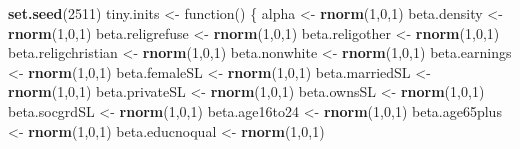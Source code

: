 \documentclass[12pt,twoside]{article}
\newenvironment{Shaded}{}{}
\newcommand{\KeywordTok}[1]{\textcolor[rgb]{0.00,0.44,0.13}{\textbf{{#1}}}}
\newcommand{\DecValTok}[1]{\textcolor[rgb]{0.25,0.63,0.44}{{#1}}}
\newcommand{\StringTok}[1]{\textcolor[rgb]{0.25,0.44,0.63}{{#1}}}
\newcommand{\NormalTok}[1]{{#1}}
\begin{document}
\begin{Shaded}
\begin{Highlighting}[]
\KeywordTok{set.seed}\NormalTok{(}\DecValTok{2511}\NormalTok{)}
\NormalTok{tiny.inits <-}\StringTok{ }\NormalTok{function() \{}
            \NormalTok{alpha <-}\StringTok{ }\KeywordTok{rnorm}\NormalTok{(}\DecValTok{1}\NormalTok{,}\DecValTok{0}\NormalTok{,}\DecValTok{1}\NormalTok{)}
            \NormalTok{beta.density <-}\StringTok{ }\KeywordTok{rnorm}\NormalTok{(}\DecValTok{1}\NormalTok{,}\DecValTok{0}\NormalTok{,}\DecValTok{1}\NormalTok{)}
            \NormalTok{beta.religrefuse <-}\StringTok{ }\KeywordTok{rnorm}\NormalTok{(}\DecValTok{1}\NormalTok{,}\DecValTok{0}\NormalTok{,}\DecValTok{1}\NormalTok{)}
            \NormalTok{beta.religother <-}\StringTok{ }\KeywordTok{rnorm}\NormalTok{(}\DecValTok{1}\NormalTok{,}\DecValTok{0}\NormalTok{,}\DecValTok{1}\NormalTok{)}
            \NormalTok{beta.religchristian <-}\StringTok{ }\KeywordTok{rnorm}\NormalTok{(}\DecValTok{1}\NormalTok{,}\DecValTok{0}\NormalTok{,}\DecValTok{1}\NormalTok{)}
            \NormalTok{beta.nonwhite <-}\StringTok{ }\KeywordTok{rnorm}\NormalTok{(}\DecValTok{1}\NormalTok{,}\DecValTok{0}\NormalTok{,}\DecValTok{1}\NormalTok{)}
            \NormalTok{beta.earnings <-}\StringTok{ }\KeywordTok{rnorm}\NormalTok{(}\DecValTok{1}\NormalTok{,}\DecValTok{0}\NormalTok{,}\DecValTok{1}\NormalTok{)}
            \NormalTok{beta.femaleSL  <-}\StringTok{ }\KeywordTok{rnorm}\NormalTok{(}\DecValTok{1}\NormalTok{,}\DecValTok{0}\NormalTok{,}\DecValTok{1}\NormalTok{)}
            \NormalTok{beta.marriedSL  <-}\StringTok{ }\KeywordTok{rnorm}\NormalTok{(}\DecValTok{1}\NormalTok{,}\DecValTok{0}\NormalTok{,}\DecValTok{1}\NormalTok{)}
            \NormalTok{beta.privateSL   <-}\StringTok{ }\KeywordTok{rnorm}\NormalTok{(}\DecValTok{1}\NormalTok{,}\DecValTok{0}\NormalTok{,}\DecValTok{1}\NormalTok{)}
            \NormalTok{beta.ownsSL   <-}\StringTok{ }\KeywordTok{rnorm}\NormalTok{(}\DecValTok{1}\NormalTok{,}\DecValTok{0}\NormalTok{,}\DecValTok{1}\NormalTok{)}
            \NormalTok{beta.socgrdSL  <-}\StringTok{ }\KeywordTok{rnorm}\NormalTok{(}\DecValTok{1}\NormalTok{,}\DecValTok{0}\NormalTok{,}\DecValTok{1}\NormalTok{)}
            \NormalTok{beta.age16to24  <-}\StringTok{ }\KeywordTok{rnorm}\NormalTok{(}\DecValTok{1}\NormalTok{,}\DecValTok{0}\NormalTok{,}\DecValTok{1}\NormalTok{)}
            \NormalTok{beta.age65plus  <-}\StringTok{ }\KeywordTok{rnorm}\NormalTok{(}\DecValTok{1}\NormalTok{,}\DecValTok{0}\NormalTok{,}\DecValTok{1}\NormalTok{)}
            \NormalTok{beta.educnoqual  <-}\StringTok{ }\KeywordTok{rnorm}\NormalTok{(}\DecValTok{1}\NormalTok{,}\DecValTok{0}\NormalTok{,}\DecValTok{1}\NormalTok{)            }

\end{Highlighting}
\end{Shaded}
\end{document}

